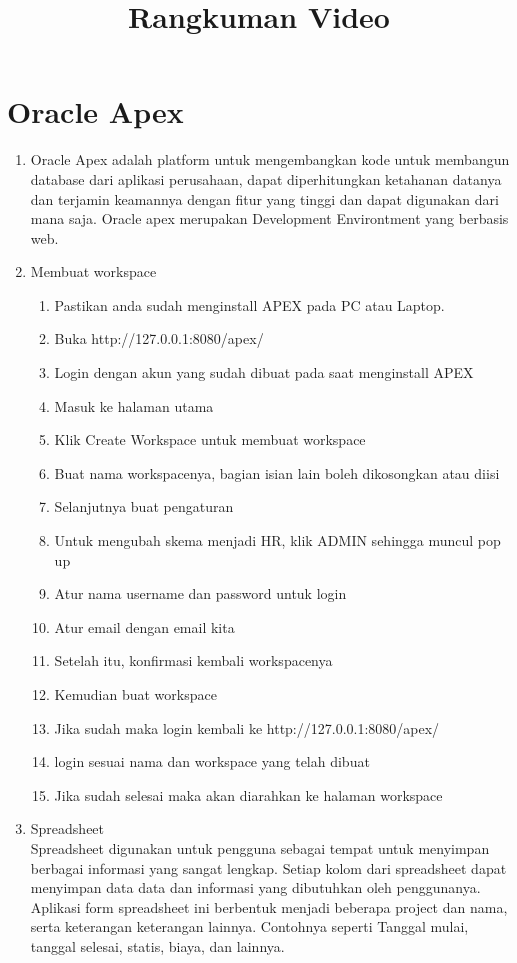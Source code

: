 \clearpage
\setcounter{page}{1}

\begin{center}
\title{\LARGE \bf Rangkuman Video }
\end{center}

\section{Oracle Apex}
	\begin{enumerate}

	\item Oracle Apex adalah platform untuk mengembangkan kode untuk membangun database dari aplikasi perusahaan, dapat 		diperhitungkan ketahanan datanya dan  terjamin keamannya dengan fitur yang tinggi dan dapat digunakan dari mana saja. Oracle apex merupakan Development Environtment yang berbasis web.
	
	\item Membuat workspace
		\begin{enumerate}[label=\alph*.]
		\item Pastikan anda sudah menginstall APEX pada PC atau Laptop.
		\item Buka http://127.0.0.1:8080/apex/
		\item Login dengan akun yang sudah dibuat pada saat menginstall APEX
		\item Masuk ke halaman utama
		\item Klik Create Workspace untuk membuat workspace
		\item Buat nama workspacenya, bagian isian lain boleh dikosongkan atau diisi
		\item Selanjutnya buat pengaturan
		\item Untuk mengubah skema menjadi HR, klik ADMIN sehingga muncul pop up
		\item Atur nama username dan password untuk login 
		\item Atur email dengan email kita
		\item Setelah itu, konfirmasi kembali workspacenya
		\item Kemudian buat workspace
		\item Jika sudah maka login kembali ke http://127.0.0.1:8080/apex/
		\item login sesuai nama dan workspace yang telah dibuat
		\item Jika sudah selesai maka akan diarahkan ke halaman workspace
		\end{enumerate}
	
	\item Spreadsheet\\
	Spreadsheet digunakan untuk pengguna sebagai tempat untuk menyimpan berbagai informasi yang sangat lengkap. Setiap kolom dari spreadsheet dapat menyimpan data data dan informasi yang dibutuhkan oleh penggunanya. Aplikasi form spreadsheet ini berbentuk menjadi beberapa project dan nama, serta keterangan keterangan lainnya. Contohnya seperti Tanggal mulai, tanggal selesai, statis, biaya, dan lainnya. 


\end{enumerate}
